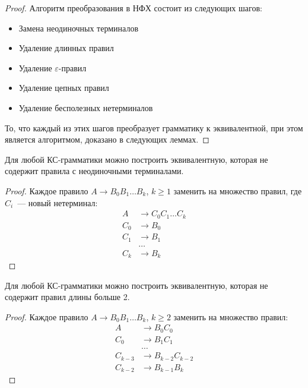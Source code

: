 \begin{proof}
    Алгоритм преобразования в НФХ состоит из следующих шагов:
    \begin{itemize}
        \item Замена неодиночных терминалов
        \item Удаление длинных правил
        \item Удаление $\varepsilon$-правил
        \item Удаление цепных правил
        \item Удаление бесполезных нетерминалов
    \end{itemize}
    То, что каждый из этих шагов преобразует грамматику к эквивалентной, при этом является алгоритмом, доказано в следующих леммах.
\end{proof}

\begin{lemma}
    Для любой КС-грамматики можно построить эквивалентную, которая не содержит правила с неодиночными терминалами.
\end{lemma}

\begin{proof}
    Каждое правило $A \to B_0 B_1 \dots B_k$, $k \geq 1$ заменить на множество правил, где $C_i$~--- новый нетерминал:
    \begin{align*}
        A   & \to C_0 C_1 \dots C_k \\
        C_0 & \to B_0               \\
        C_1 & \to B_1               \\
            & \dots                 \\
        C_k & \to B_k
    \end{align*}
\end{proof}

\begin{lemma}
    Для любой КС-грамматики можно построить эквивалентную, которая не содержит правил длины больше 2.
\end{lemma}

\begin{proof}
    Каждое правило $A \to B_0 B_1 \dots B_k$, $k \geq 2$ заменить на множество правил:
    \begin{align*}
        A       & \to B_0 C_0         \\
        C_0     & \to B_1 C_1         \\
                & \dots               \\
        C_{k-3} & \to B_{k-2} C_{k-2} \\
        C_{k-2} & \to B_{k-1} B_k
    \end{align*}
\end{proof}


